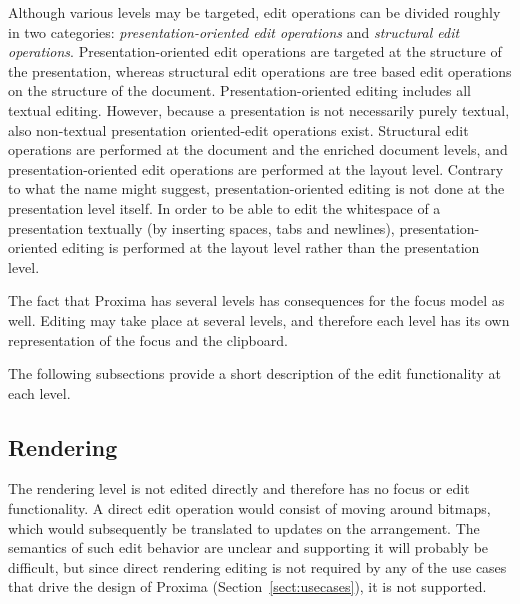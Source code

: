 


Although various levels may be targeted, edit operations can be divided roughly in two categories: {\em presentation-oriented edit operations} and {\em structural edit operations}. Presentation-oriented edit operations are targeted at the structure of the presentation, whereas structural edit operations are tree based edit operations on the structure of the document.  Presentation-oriented editing includes all textual editing. However, because a presentation is not necessarily purely textual, also non-textual presentation oriented-edit operations exist. Structural edit operations are performed at the document and the enriched document levels, and presentation-oriented edit operations are performed at the layout level. Contrary to what the name might suggest, presentation-oriented editing is not done at the presentation level itself. In order to be able to edit the whitespace of a presentation textually (by inserting spaces, tabs and newlines), presentation-oriented editing is performed at the layout level rather than the presentation level. 


The fact that Proxima has several levels has consequences for the focus model as well.  Editing may take place at several levels, and therefore each level has its own representation of the focus and the clipboard. 

The following subsections provide a short description of the edit functionality at each level. 
 
%									
\subsection{Rendering}

The rendering level is not edited directly and therefore has no focus or edit functionality. A direct edit operation would consist of moving around bitmaps, which would subsequently be translated to updates on the arrangement. The semantics of such edit behavior are unclear and supporting it will probably be difficult, but since direct rendering editing is not required by any of the use cases that drive the design of Proxima (Section~\ref{sect:usecases}), it is not supported.
 
